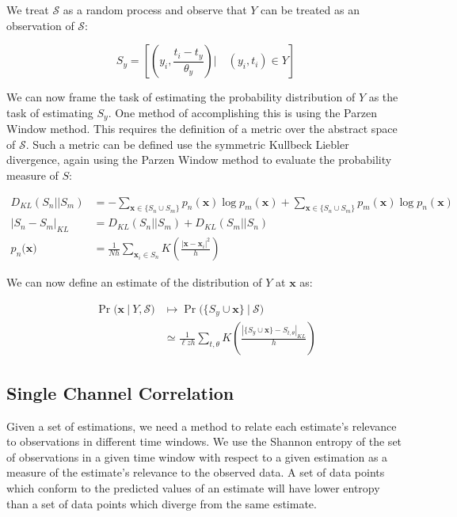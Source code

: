 \documentclass[10pt]{article}
\begin{document}
We treat \( \mathcal{S} \) as a random process and observe that \( Y \) can be treated as an observation of \( \mathcal{S} \):

\[ S_y =  \left[ \left( y_i,\frac{t_i - t_y}{\theta_y} \right) \Big| \quad (y_i,t_i) \in Y \right] \]

We can now frame the task of estimating the probability distribution of \( Y \) as the task of estimating \( S_y \).  One method of accomplishing this is using the Parzen Window method.  This requires the definition of a metric over the abstract space of \( \mathcal{S} \).  Such a metric can be defined use the symmetric Kullbeck Liebler divergence, again using the Parzen Window method to evaluate the probability measure of \( S \):

\begin{align}
D_{KL}(S_n||S_m) &= -\sum_{\mathbf{x} \in \{ S_n \cup S_m \} } p_n(\mathbf{x}) \log p_m(\mathbf{x}) + \sum_{\mathbf{x} \in \{ S_n \cup S_m \} } p_m(\mathbf{x}) \log p_n(\mathbf{x}) \\
|S_n - S_m|_{KL} &= D_{KL}(S_n||S_m) + D_{KL}(S_m||S_n) \\
p_n\big( \mathbf{x} \big) &= \frac{1}{Nh} \sum_{\mathbf{x}_i \in S_n} K \left( \frac{ | \mathbf{x} - \mathbf{x}_i |^2 }{ h} \right)
\end{align}

We can now define an estimate of the distribution of \( Y \) at \( \mathbf{x} \) as:

\begin{align} 
\Pr\big( \mathbf{x} \ | \ Y, \mathcal{S} \big) &\mapsto \Pr\big( \{ S_y \cup \mathbf{x} \} \ | \ \mathcal{S} \big) \nonumber \\
&\simeq \frac{1}{\ell z h} \sum_{t,\theta} K \left( \frac{ \left| \{ S_y \cup \mathbf{x} \} - S_{t,\theta} \right|_{KL} } { h } \right)
\end{align}

\subsection{Single Channel Correlation}

Given a set of estimations, we need a method to relate each estimate's relevance to observations in different time windows.  We use the Shannon entropy of the set of observations in a given time window with respect to a given estimation as a measure of the estimate's relevance to the observed data.  A set of data points which conform to the predicted values of an estimate will have lower entropy than a set of data points which diverge from the same estimate.
\end{document}
